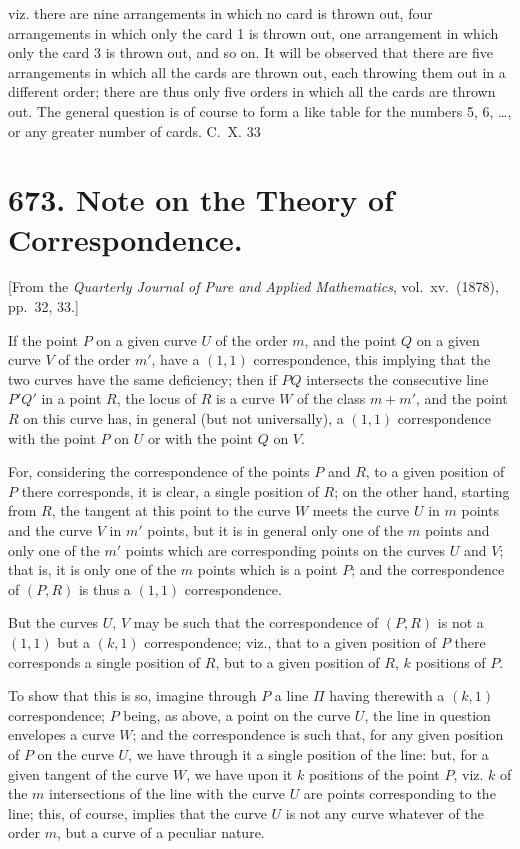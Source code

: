 \documentclass[11pt,a4paper]{book}
\begin{document}
viz. there are nine arrangements in which no card is thrown out, four arrangements in which only the card 1 is thrown out, one arrangement in which only the card 3 is thrown out, and so on. It will be observed that there are five arrangements in which all the cards are thrown out, each throwing them out in a different order; there are thus only five orders in which all the cards are thrown out. The general question is of course to form a like table for the numbers 5, 6, \dots{}, or any greater number of cards.
\hfill C.~X. 33

\newpage

\section*{673. Note on the Theory of Correspondence.}

[From the \textit{Quarterly Journal of Pure and Applied Mathematics}, vol.\ xv.\ (1878), pp.\ 32, 33.]

If the point $P$ on a given curve $U$ of the order $m$, and the point $Q$ on a given curve $V$ of the order $m'$, have a $(1,1)$ correspondence, this implying that the two curves have the same deficiency; then if $PQ$ intersects the consecutive line $P'Q'$ in a point $R$, the locus of $R$ is a curve $W$ of the class $m + m'$, and the point $R$ on this curve has, in general (but not universally), a $(1,1)$ correspondence with the point $P$ on $U$ or with the point $Q$ on $V$.

For, considering the correspondence of the points $P$ and $R$, to a given position of $P$ there corresponds, it is clear, a single position of $R$; on the other hand, starting from $R$, the tangent at this point to the curve $W$ meets the curve $U$ in $m$ points and the curve $V$ in $m'$ points, but it is in general only one of the $m$ points and only one of the $m'$ points which are corresponding points on the curves $U$ and $V$; that is, it is only one of the $m$ points which is a point $P$; and the correspondence of $(P, R)$ is thus a $(1,1)$ correspondence.

But the curves $U$, $V$ may be such that the correspondence of $(P, R)$ is not a $(1,1)$ but a $(k,1)$ correspondence; viz., that to a given position of $P$ there corresponds a single position of $R$, but to a given position of $R$, $k$ positions of $P$.

To show that this is so, imagine through $P$ a line $\Pi$ having therewith a $(k,1)$ correspondence; $P$ being, as above, a point on the curve $U$, the line in question envelopes a curve $W$; and the correspondence is such that, for any given position of $P$ on the curve $U$, we have through it a single position of the line: but, for a given tangent of the curve $W$, we have upon it $k$ positions of the point $P$, viz. $k$ of the $m$ intersections of the line with the curve $U$ are points corresponding to the line; this, of course, implies that the curve $U$ is not any curve whatever of the order $m$, but a curve of a peculiar nature.
\end{document}
